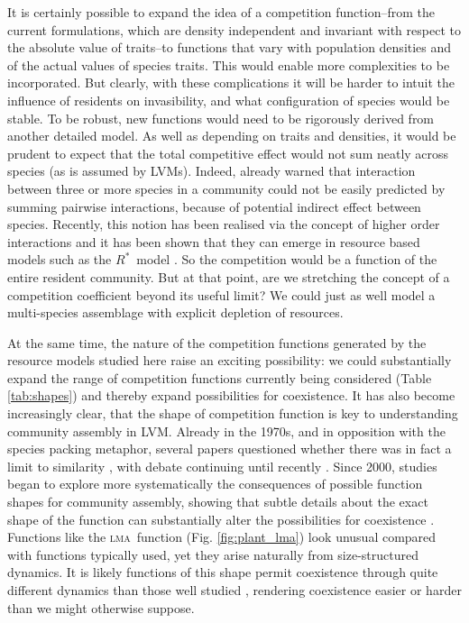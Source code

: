 \documentclass[a4paper,11pt]{article}
\newcommand{\Rstar}{\ensuremath{R^*}}
\newcommand{\lma}{\textsc{lma}}
\begin{document}
It is certainly possible to expand the idea of a competition function--from the current formulations, which are density independent and invariant with respect to the absolute value of traits--to functions that vary with population densities and of the actual values of species traits. This would enable more complexities to be incorporated. But clearly, with these complications it will be harder to intuit the influence of residents on invasibility, and what configuration of species would be stable. To be robust, new functions would need to be rigorously derived from another detailed model. As well as depending on traits and densities, it would be prudent to expect that the total competitive effect would not sum neatly across species (as is assumed by LVMs). Indeed, \citet{Levine-1976} already warned that interaction between three or more species in a community could not be easily predicted by summing pairwise interactions, because of potential indirect effect between species. Recently, this notion has been realised via the concept of higher order interactions \citep{Levine-2017} and it has been shown that they can emerge in resource based models such as the \Rstar\ model \citep{Letten-2019}. So the competition would be a function of the entire resident community. But at that point, are we stretching the concept of a competition coefficient beyond its useful limit? We could just as well model a multi-species assemblage with explicit depletion of resources.

At the same time, the nature of the competition functions generated by the resource models studied here raise an exciting possibility: we could substantially expand the range of competition functions currently being considered (Table \ref{tab:shapes}) and thereby expand possibilities for coexistence. It has also become increasingly clear, that the shape of competition function is key to understanding community assembly in LVM. Already in the 1970s, and in opposition with the species packing metaphor, several papers questioned whether there was in fact a limit to similarity \citep{May-1972, Abrams-1975, Abrams-1983}, with debate continuing until recently \citep{Meszena-2006, Barabas-2012, Leimar-2013}. Since 2000, studies began to explore more systematically the consequences of possible function shapes for community assembly, showing that subtle details about the exact shape of the function can substantially alter the possibilities for coexistence \citep{Calcagno-2006, Scheffer-2006, Pigolotti-2007, Barabas-2012,Barabas-2013,DAndrea-2013,Leimar-2013}. Functions like the \lma\ function (Fig. \ref{fig:plant_lma}) look unusual compared with functions typically used, yet they arise naturally from size-structured dynamics. It is likely functions of this shape permit coexistence through quite different dynamics than those well studied \citep[e.g.][]{Leimar-2013}, rendering coexistence easier or harder than we might otherwise suppose.
\end{document}
